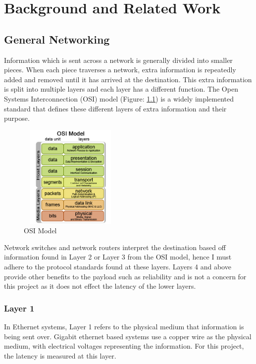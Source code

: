 \chapter{Background and Related Work}\label{C:back}

\section{General Networking}

Information which is sent across a network is generally divided into smaller pieces. When each piece
traverses a network, extra information is repeatedly added and removed until it has arrived at the
destination. This extra information is split into multiple layers and each layer has a different function.
The Open Systems Interconnection (OSI) model (Figure: \ref{fig:OSIModel}) is a widely implemented standard that
defines these different layers of extra information and their purpose.

\begin{figure}[H]
    \begin{center}
        \includegraphics[width=5cm,height=5cm,keepaspectratio]{Images/OSIModel.png}
        \caption{OSI Model \cite{OSIPic}}
        \label{fig:OSIModel}
    \end{center}
\end{figure}

Network switches and network routers interpret the destination based off information found in
Layer 2 or Layer 3 from the OSI model, hence I must adhere to the protocol standards found at these
layers. Layers 4 and above provide other benefits to the payload such as reliability and is not a
concern for this project as it does not effect the latency of the lower layers.

\subsection{Layer 1}

In Ethernet systems, Layer 1 refers to the physical medium that information is being sent over.
Gigabit ethernet based systems use a copper wire as the physical medium, with electrical voltages
representing the information. For this project, the latency is measured at this layer.


